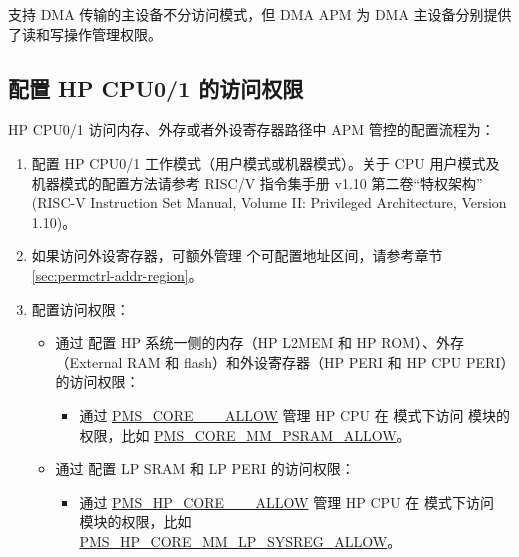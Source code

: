 \documentclass[main\_\_CN.tex]{subfiles}
\begin{document}
支持 DMA 传输的主设备不分访问模式，但 DMA APM 为 DMA 主设备分别提供了读和写操作管理权限。

\subsection{配置 HP CPU0/1 的访问权限}

HP CPU0/1 访问内存、外存或者外设寄存器路径中 APM 管控的配置流程为：

\begin{enumerate}
    \item 配置 HP CPU0/1 工作模式（用户模式或机器模式）。关于 CPU 用户模式及机器模式的配置方法请参考 RISC\-/V 指令集手册 v1.10 第二卷“特权架构” (RISC-V Instruction Set Manual, Volume II: Privileged Architecture, Version 1.10)。
    \item 如果访问外设寄存器，可额外管理  个可配置地址区间，请参考章节 \ref{sec:permctrl-addr-region}。
    \item 配置访问权限：
    \begin{itemize}
        \item 通过  配置 HP 系统一侧的内存（HP L2MEM 和 HP ROM）、外存（External RAM 和 flash）和外设寄存器（HP PERI 和 HP CPU PERI）的访问权限：
        \begin{itemize}
            \item 通过 \hyperref[fielddesc:PMSCORENMML2ROMALLOW]{PMS\_CORE\_\_\_ALLOW} 管理 HP CPU 在  模式下访问  模块的权限，比如 \hyperref[fielddesc:PMSCORENMMPSRAMALLOW]{PMS\_CORE\_MM\_PSRAM\_ALLOW}。
        \end{itemize}
        \item 通过  配置 LP SRAM 和 LP PERI 的访问权限：
            \begin{itemize}
            \item 通过 \hyperref[fielddesc:PMSHPCORENMMLPSYSREGALLOW]{PMS\_HP\_CORE\_\_\_ALLOW} 管理 HP CPU 在  模式下访问  模块的权限，比如 \hyperref[fielddesc:PMSHPCORENMMLPSYSREGALLOW]{PMS\_HP\_CORE\_MM\_LP\_SYSREG\_ALLOW}。
        \end{itemize}
    \end{itemize}
\end{enumerate}
\end{document}
